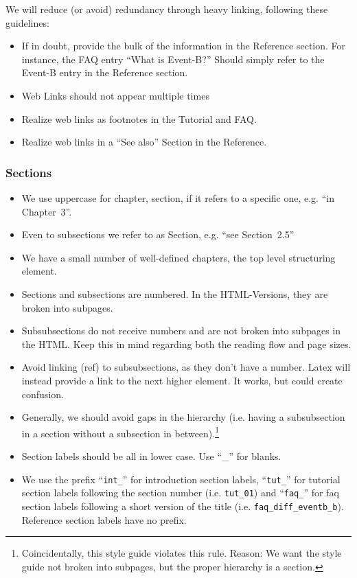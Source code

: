 We will reduce (or avoid) redundancy through heavy linking, following these guidelines:

\begin{itemize}
	\item If in doubt, provide the bulk of the information in the Reference section.  For instance, the FAQ entry ``What is Event-B?''  Should simply refer to the Event-B entry in the Reference section.
	\item Web Links should not appear multiple times
	\item Realize web links as footnotes in the Tutorial and FAQ.
	\item Realize web links in a ``See also'' Section in the Reference.
\end{itemize}

\subsubsection{Sections}

\begin{itemize}
	\item We use uppercase for chapter, section, if it refers to a specific one, e.g. ``in Chapter~3''.
	\item Even to subsections we refer to as Section, e.g. ``see Section~2.5''
	\item We have a small number of well-defined chapters, the top level structuring element.
	\item Sections and subsections are numbered.  In the HTML-Versions, they are broken into subpages.
    \item Subsubsections do not receive numbers and are not broken into subpages in the HTML.  Keep this in mind regarding both the reading flow and page sizes.
	\item Avoid linking (ref) to subsubsections, as they don't have a number.  Latex will instead provide a link to the next higher element.  It works, but could create confusion.
	\item Generally, we should avoid gaps in the hierarchy (i.e. having a subsubsection in a section without a subsection in between).\footnote{Coincidentally, this style guide violates this rule. Reason: We want the style guide not broken into subpages, but the proper hierarchy is a section.}
	\item Section labels should be all in lower case. Use ``\_'' for blanks.
	\item We use the prefix ``\texttt{int\_}'' for introduction section labels, ``\texttt{tut\_}'' for tutorial section labels following the section number (i.e. \texttt{tut\_01}) and ``\texttt{faq\_}'' for faq section labels following a short version of the title (i.e. \texttt{faq\_diff\_eventb\_b}). Reference section labels have no prefix.
\end{itemize}

